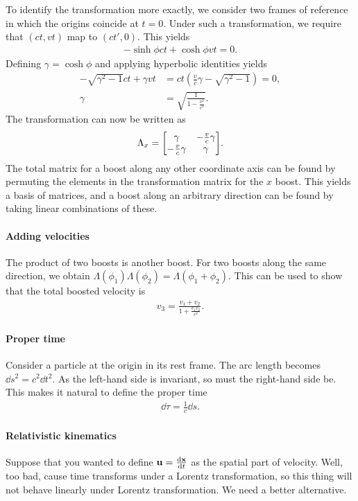 To identify the transformation more exactly, we consider two frames of reference in which the origins coincide at $t = 0$. Under such a transformation, we require that $(ct, vt)$ map to $(ct', 0)$. This yields
\begin{align*}
	-\sinh{\phi}ct + \cosh{\phi}vt = 0.
\end{align*}
Defining $\gamma = \cosh{\phi}$ and applying hyperbolic identities yields
\begin{align*}
	-\sqrt{\gamma^{2} - 1}ct + \gamma vt &= ct\left(\frac{v}{c}\gamma - \sqrt{\gamma^{2} - 1}\right) = 0, \\
	\gamma                               &= \sqrt{\frac{1}{1 - \frac{v^{2}}{c^{2}}}}.
\end{align*}
The transformation can now be written as
\begin{align*}
	\Lambda_{x} = 
	\mqty[
		\gamma             & -\frac{v}{c}\gamma \\
		-\frac{v}{c}\gamma & \gamma
	].
\end{align*}
The total matrix for a boost along any other coordinate axis can be found by permuting the elements in the transformation matrix for the $x$ boost. This yields a basis of matrices, and a boost along an arbitrary direction can be found by taking linear combinations of these.

\paragraph{Adding velocities}
The product of two boosts is another boost. For two boosts along the same direction, we obtain $\Lambda(\phi_{1})\Lambda(\phi_{2}) = \Lambda(\phi_{1} + \phi_{2})$. This can be used to show that the total boosted velocity is
\begin{align*}
	v_{3} = \frac{v_{1} + v_{2}}{1 + \frac{v_{1}v_{2}}{c^{2}}}.
\end{align*}

\paragraph{Proper time}
Consider a particle at the origin in its rest frame. The arc length becomes $\dd{s}^{2} = c^{2}\dd{t}^{2}$. As the left-hand side is invariant, so must the right-hand side be. This makes it natural to define the proper time
\begin{align*}
	\dd{\tau} = \frac{1}{c}\dd{s}.
\end{align*}

\paragraph{Relativistic kinematics}
Suppose that you wanted to define $\vb{u} = \dv{\vb{x}}{t}$ as the spatial part of velocity. Well, too bad, cause time transforms under a Lorentz transformation, so this thing will not behave linearly under Lorentz transformation. We need a better alternative.


